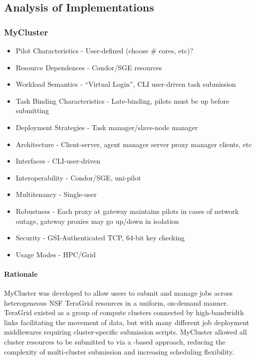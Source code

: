 \documentclass{sig-alternate}
\begin{document}
\subsection{Analysis of \pilotjob Implementations}



\subsubsection{MyCluster}
\begin{itemize}
  \item
    Pilot Characteristics - User-defined (choose \# cores, etc)?
  \item
    Resource Dependences - Condor/SGE resources
  \item
    Workload Semantics - ``Virtual Login'', CLI user-driven task submission
  \item
    Task Binding Characteristics - Late-binding, pilots must be up before submitting
  \item
    Deployment Strategies - Task manager/slave-node manager
  \item
    Architecture - Client-server, agent manager server proxy manager clients, etc
  \item
    Interfaces - CLI-user-driven
  \item
    Interoperability - Condor/SGE, uni-pilot
  \item
    Multitenancy - Single-user
  \item
    Robustness - Each proxy at gateway maintains pilots in cases of network outage, gateway proxies
    may go up/down in isolation
  \item
    Security - GSI-Authenticated TCP, 64-bit key checking
  \item
    Usage Modes - HPC/Grid
\end{itemize}

\paragraph{Rationale}
MyCluster was developed to allow users to submit and manage
jobs across heterogeneous NSF TeraGrid resources in a uniform,
on-demand manner.  TeraGrid existed as a group of compute clusters
connected by high-bandwidth links facilitating the movement
of data, but with many different job deployment middlewares
requiring cluster-specific submission scripts.  MyCluster
allowed all cluster resources to be submitted to via a
\pilotjob-based approach, reducing the complexity of
multi-cluster submission and increasing scheduling flexibility.
\end{document}
